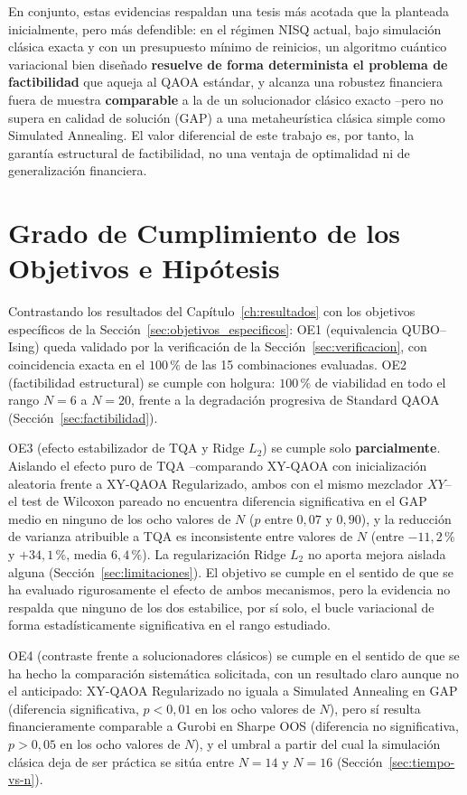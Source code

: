 En conjunto, estas evidencias respaldan una tesis más acotada que la planteada inicialmente, pero más defendible:
en el régimen NISQ actual, bajo simulación clásica exacta y con un presupuesto mínimo de reinicios, un algoritmo
cuántico variacional bien diseñado \textbf{resuelve de forma determinista el problema de factibilidad} que
aqueja al QAOA estándar, y alcanza una robustez financiera fuera de muestra \textbf{comparable} a la de un
solucionador clásico exacto --pero no supera en calidad de solución (GAP) a una metaheurística clásica simple
como Simulated Annealing. El valor diferencial de este trabajo es, por tanto, la garantía estructural de
factibilidad, no una ventaja de optimalidad ni de generalización financiera.

\section{Grado de Cumplimiento de los Objetivos e Hipótesis}
\label{sec:cumplimiento_objetivos}

Contrastando los resultados del Capítulo~\ref{ch:resultados} con los objetivos específicos de la
Sección~\ref{sec:objetivos_especificos}: OE1 (equivalencia QUBO--Ising) queda validado por la verificación de la
Sección~\ref{sec:verificacion}, con coincidencia exacta en el $100\,\%$ de las 15 combinaciones evaluadas. OE2
(factibilidad estructural) se cumple con holgura: $100\,\%$ de viabilidad en todo el rango $N=6$ a $N=20$, frente
a la degradación progresiva de Standard QAOA (Sección~\ref{sec:factibilidad}).

OE3 (efecto estabilizador de TQA y Ridge $L_2$) se cumple solo \textbf{parcialmente}. Aislando el efecto puro de
TQA --comparando XY-QAOA con inicialización aleatoria frente a XY-QAOA Regularizado, ambos con el mismo
mezclador $XY$-- el test de Wilcoxon pareado no encuentra diferencia significativa en el GAP medio en ninguno de
los ocho valores de $N$ ($p$ entre $0{,}07$ y $0{,}90$), y la reducción de varianza atribuible a TQA es
inconsistente entre valores de $N$ (entre $-11{,}2\,\%$ y $+34{,}1\,\%$, media $6{,}4\,\%$). La regularización
Ridge $L_2$ no aporta mejora aislada alguna (Sección~\ref{sec:limitaciones}). El objetivo se cumple en el
sentido de que se ha evaluado rigurosamente el efecto de ambos mecanismos, pero la evidencia no respalda que
ninguno de los dos estabilice, por sí solo, el bucle variacional de forma estadísticamente significativa en el
rango estudiado.

OE4 (contraste frente a solucionadores clásicos) se cumple en el sentido de que se ha hecho la comparación
sistemática solicitada, con un resultado claro aunque no el anticipado: XY-QAOA Regularizado no iguala a
Simulated Annealing en GAP (diferencia significativa, $p<0{,}01$ en los ocho valores de $N$), pero sí resulta
financieramente comparable a Gurobi en Sharpe OOS (diferencia no significativa, $p>0{,}05$ en los ocho valores
de $N$), y el umbral a partir del cual la simulación clásica deja de ser práctica se sitúa entre $N=14$ y $N=16$
(Sección~\ref{sec:tiempo-vs-n}).

